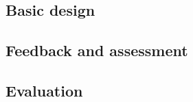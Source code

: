 \subsection{Basic design}\label{chapter:testing_basic_design}


\subsection{Feedback and assessment}\label{chapter:testing_assessment}


\subsection{Evaluation}\label{chapter:testing_evaluation}
